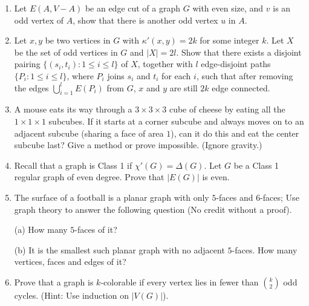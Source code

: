 \begin{enumerate}
    \item Let \( E(A, V - A) \) be an edge cut of a graph \( G \) with even size, and \( v \) is an odd vertex of \( A \), show that there is another odd vertex \( u \) in \( A \).


    \item Let \( x, y \) be two vertices in \( G \) with \( \kappa'(x, y) = 2k \) for some integer \( k \). Let  
    \( X \) be the set of odd vertices in \( G \) and \( |X| = 2l \). Show that there exists a  
    disjoint pairing \(\{(s_i, t_i) : 1 \leq i \leq l\}\) of \( X \), together with \( l \) edge-disjoint paths  
    \(\{P_i : 1 \leq i \leq l\}\), where \( P_i \) joins \( s_i \) and \( t_i \) for each \( i \), such that after removing  
    the edges \(\bigcup_{i=1}^l E(P_i)\) from \( G \), \( x \) and \( y \) are still \( 2k \) edge connected.


    \item A mouse eats its way through a \( 3 \times 3 \times 3 \) cube of cheese by eating all the  
    \( 1 \times 1 \times 1 \) subcubes. If it starts at a corner subcube and always moves on to an  
    adjacent subcube (sharing a face of area $1$), can it do this and eat the center  
    subcube last? Give a method or prove impossible. (Ignore gravity.)



    \item Recall that a graph is Class 1 if \(\chi'(G) = \Delta(G)\). Let \(G\) be a Class 1 regular graph of even degree. Prove that \(|E(G)|\) is even.


    \item The surface of a football is a planar graph with only $5$-faces and $6$-faces; Use  
    graph theory to answer the following question (No credit without a proof).  
   
    (a) How many $5$-faces of it?  

    (b) It is the smallest such planar graph with no adjacent $5$-faces. 
    How many vertices, faces and edges of it?  

    \item Prove that a graph is \( k \)-colorable if every vertex lies in fewer than \( \binom{k}{2} \) odd cycles. (Hint: Use induction on \( |V(G)| \)).  
\end{enumerate}

